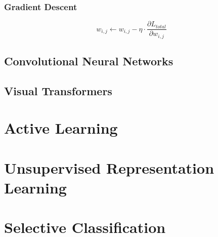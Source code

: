 \subsubsection{Gradient Descent}

\begin{equation}
	w_{i,j} \leftarrow w_{i,j} - \eta \cdot \frac{\partial L_{total}}{\partial w_{i,j}}
	\label{gradient_descent}
\end{equation}



\subsection{Convolutional Neural Networks}
\label{subsec:convolutional_neural_networks}



\subsection{Visual Transformers}
\label{subsec:visual_transformers}





\section{Active Learning}
\label{sec:active_learning}





\section{Unsupervised Representation Learning}
\label{sec:unsupervised_representation_learning}





\section{Selective Classification}
\label{sec:selective_classification}
